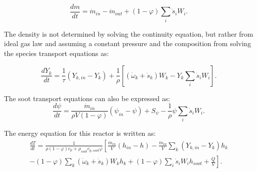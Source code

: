 \begin{equation}
	\frac{d m}{d t}
	=
	\dot{m}_{in} - \dot{m}_{out} 
	+ (1-\varphi) \sum_i \dot{s}_i W_i 
	\label{eqn:contpsr}.
\end{equation}

The density is not determined by solving the continuity equation, but rather from ideal gas law and assuming a constant pressure and the composition from solving the species transport equations as:

\begin{equation}
	\frac{d Y_k}{d t}
	=
	\frac{1}{\tau}
	\left(Y_{k,in}-Y_k \right)+
	\frac{1}{\rho}\left[\left(\dot{\omega}_k+\dot{s}_k\right) W_k-Y_k \sum_i \dot{s}_i W_i\right]
	\label{eqn:speciespsr}.
\end{equation}

The soot transport equations can also be expressed as:
\begin{equation}
	\frac{d\psi}{dt}
	=
	\frac{{\dot{m}}_{in}}{\rho V
		\left(1-\varphi\right)}
	\left(\psi_{in}-\psi\right)
	+
	S_{\psi}
	-\frac{1}{\rho}\psi\sum_{i}{{\dot{s}}_i W_i}
	\label{eqn:sootpsr}.
\end{equation}

The energy equation for this reactor is written as:
\begin{equation}
	\begin{split}
		\frac{dT}{dt}
		=
		\frac{1}
		{
			\rho\left(1-\varphi\right)c_p+\rho_{soot}c_{p,soot}\varphi
		}
		\left[
		\frac{{\dot{m}}_{in}}{V}
		\left(h_{in}-h\right)
		-
		\frac{{\dot{m}}_{in}}{V}\sum_{k}\left(Y_{k,in}-Y_k\right)h_k
		\right.\\
		\left.	
		-
		\left(1-\varphi\right)\sum_{k}{
			\left(
			{\dot{\omega}}_k
			+
			{\dot{s}}_k
			\right) W_k h_k}
		+\left(1-\varphi\right) \sum_{i}{{\dot{s}}_i W_i} h_{soot}+\frac{\dot{Q}}{V}
		\right].
	\end{split}
		\label{eqn:energypsr}
\end{equation}



